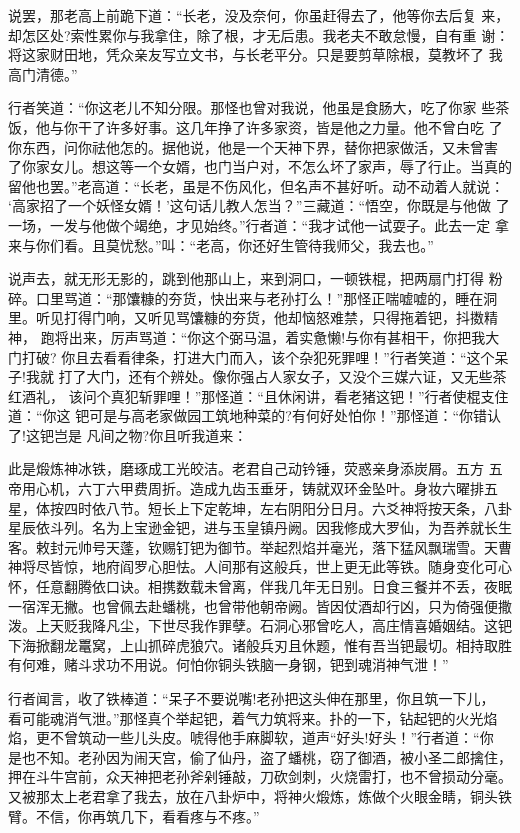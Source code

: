 说罢，那老高上前跪下道：“长老，没及奈何，你虽赶得去了，他等你去后复
来，却怎区处?索性累你与我拿住，除了根，才无后患。我老夫不敢怠慢，自有重
谢：将这家财田地，凭众亲友写立文书，与长老平分。只是要剪草除根，莫教坏了
我高门清德。”

行者笑道：“你这老儿不知分限。那怪也曾对我说，他虽是食肠大，吃了你家
些茶饭，他与你干了许多好事。这几年挣了许多家资，皆是他之力量。他不曾白吃
了你东西，问你祛他怎的。据他说，他是一个天神下界，替你把家做活，又未曾害
了你家女儿。想这等一个女婿，也门当户对，不怎么坏了家声，辱了行止。当真的
留他也罢。”老高道：“长老，虽是不伤风化，但名声不甚好听。动不动着人就说：
‘高家招了一个妖怪女婿！’这句话儿教人怎当？”三藏道：“悟空，你既是与他做
了一场，一发与他做个竭绝，才见始终。”行者道：“我才试他一试耍子。此去一定
拿来与你们看。且莫忧愁。”叫：“老高，你还好生管待我师父，我去也。”

说声去，就无形无影的，跳到他那山上，来到洞口，一顿铁棍，把两扇门打得
粉碎。口里骂道：“那馕糠的夯货，快出来与老孙打么！”那怪正喘嘘嘘的，睡在洞
里。听见打得门响，又听见骂馕糠的夯货，他却恼怒难禁，只得拖着钯，抖擞精神，
跑将出来，厉声骂道：“你这个弼马温，着实惫懒!与你有甚相干，你把我大门打破?
你且去看看律条，打进大门而入，该个杂犯死罪哩！”行者笑道：“这个呆子!我就
打了大门，还有个辨处。像你强占人家女子，又没个三媒六证，又无些茶红酒礼，
该问个真犯斩罪哩！”那怪道：“且休闲讲，看老猪这钯！”行者使棍支住道：“你这
钯可是与高老家做园工筑地种菜的?有何好处怕你！”那怪道：“你错认了!这钯岂是
凡间之物?你且听我道来：

此是煅炼神冰铁，磨琢成工光皎洁。老君自己动钤锤，荧惑亲身添炭屑。五方
五帝用心机，六丁六甲费周折。造成九齿玉垂牙，铸就双环金坠叶。身妆六曜排五
星，体按四时依八节。短长上下定乾坤，左右阴阳分日月。六爻神将按天条，八卦
星辰依斗列。名为上宝逊金钯，进与玉皇镇丹阙。因我修成大罗仙，为吾养就长生
客。敕封元帅号天蓬，钦赐钉钯为御节。举起烈焰并毫光，落下猛风飘瑞雪。天曹
神将尽皆惊，地府阎罗心胆怯。人间那有这般兵，世上更无此等铁。随身变化可心
怀，任意翻腾依口诀。相携数载未曾离，伴我几年无日别。日食三餐并不丢，夜眠
一宿浑无撇。也曾佩去赴蟠桃，也曾带他朝帝阙。皆因仗酒却行凶，只为倚强便撒
泼。上天贬我降凡尘，下世尽我作罪孽。石洞心邪曾吃人，高庄情喜婚姻结。这钯
下海掀翻龙鼍窝，上山抓碎虎狼穴。诸般兵刃且休题，惟有吾当钯最切。相持取胜
有何难，赌斗求功不用说。何怕你铜头铁脑一身钢，钯到魂消神气泄！”

行者闻言，收了铁棒道：“呆子不要说嘴!老孙把这头伸在那里，你且筑一下儿，
看可能魂消气泄。”那怪真个举起钯，着气力筑将来。扑的一下，钻起钯的火光焰
焰，更不曾筑动一些儿头皮。唬得他手麻脚软，道声“好头!好头！”行者道：“你
是也不知。老孙因为闹天宫，偷了仙丹，盗了蟠桃，窃了御酒，被小圣二郎擒住，
押在斗牛宫前，众天神把老孙斧剁锤敲，刀砍剑刺，火烧雷打，也不曾损动分毫。
又被那太上老君拿了我去，放在八卦炉中，将神火煅炼，炼做个火眼金睛，铜头铁
臂。不信，你再筑几下，看看疼与不疼。”

